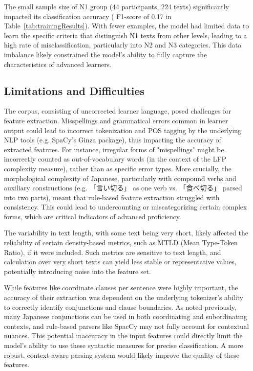 The small sample size of N1 group (44 participants, 224 texts) significantly impacted its classification accuracy (
F1-score
of 0.17 in Table~\ref{tab:trainingResults}). With fewer examples, the model had limited data to learn the specific
criteria that distinguish N1 texts from other levels, leading to a high rate of misclassification, particularly into
N2 and N3 categories. This data imbalance likely constrained the model's ability to fully capture the
characteristics of advanced learners.


\subsection{Limitations and Difficulties}
The corpus, consisting of uncorrected learner language, posed challenges for feature extraction. Misspellings and
grammatical errors common in learner output could lead to incorrect tokenization and POS tagging by the underlying
NLP tools (e.g. SpaCy's Ginza package), thus impacting the accuracy of extracted features. For instance, irregular
forms of "mispellings" might be incorrectly counted as out-of-vocabulary words (in the context of the LFP complexity
measure), rather than as specific error types. More crucially, the morphological complexity of Japanese,
particularly with compound verbs and auxiliary constructions (e.g. 「言い切る」 as one verb vs. 「食べ切る」 parsed into two
parts), meant that rule-based feature extraction struggled with consistency. This could lead to undercounting or
miscategorizing certain complex forms, which are critical indicators of advanced proficiency.

The variability in text length, with some text being very short, likely affected the reliability of certain
density-based metrics, such as MTLD (Mean Type-Token Ratio), if it were included. Such metrics are sensitive to text
length, and calculation over very short texts can yield less stable or representative values, potentially
introducing noise into the feature set.

While features like coordinate clauses per sentence were highly important, the accuracy of their extraction was
dependent on the underlying tokenizer's ability to correctly identify conjunctions and clause boundaries. As noted
previously, many Japanese conjunctions can be used in both coordinating and subordinating contexts, and rule-based
parsers like SpacCy may not fully account for contextual nuances. This potential inaccuracy in the input features
could directly limit the model's ability to use these syntactic measures for precise classification. A more robust,
context-aware parsing system would likely improve the quality of these features.

